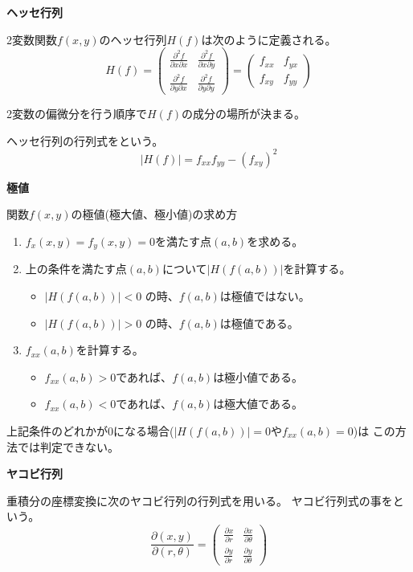 \documentclass[12pt,b5paper]{ltjsarticle}
\begin{document}
\textbf{ヘッセ行列}

2変数関数$f(x,y)$のヘッセ行列$H(f)$は次のように定義される。
\begin{equation}
 H(f)=
  \begin{pmatrix}
   \frac{\partial^2 f}{\partial x\partial x} & \frac{\partial^2 f}{\partial x\partial y}\\
   \frac{\partial^2 f}{\partial y\partial x} & \frac{\partial^2 f}{\partial y\partial y}
  \end{pmatrix}
  =
  \begin{pmatrix}
   f_{xx} & f_{yx}\\
   f_{xy} & f_{yy}
  \end{pmatrix}
\end{equation}

2変数の偏微分を行う順序で$H(f)$の成分の場所が決まる。

ヘッセ行列の行列式をという。
\begin{equation}
 \lvert H(f) \rvert = f_{xx}f_{yy}-(f_{xy})^2
\end{equation}


\textbf{極値}

関数$f(x,y)$の極値(極大値、極小値)の求め方

\begin{enumerate}
 \item $f_x(x,y)=f_y(x,y)=0$を満たす点$(a,b)$を求める。
 \item 上の条件を満たす点$(a,b)$について$\lvert H(f(a,b)) \rvert$を計算する。
       \begin{itemize}
        \item $\lvert H(f(a,b)) \rvert <0$ の時、$f(a,b)$は極値ではない。
        \item $\lvert H(f(a,b)) \rvert >0$ の時、$f(a,b)$は極値である。
       \end{itemize}
 \item $f_{xx}(a,b)$を計算する。
       \begin{itemize}
        \item $f_{xx}(a,b) >0$であれば、$f(a,b)$は極小値である。
        \item $f_{xx}(a,b) <0$であれば、$f(a,b)$は極大値である。
       \end{itemize}
\end{enumerate}
上記条件のどれかが0になる場合($\lvert H(f(a,b)) \rvert =0$や$f_{xx}(a,b) =0$)は
この方法では判定できない。


\textbf{ヤコビ行列}

重積分の座標変換に次のヤコビ行列の行列式を用いる。
ヤコビ行列式の事をという。
\begin{equation}
 \frac{\partial (x,y)}{\partial (r,\theta)}
  =
  \begin{pmatrix}
   \frac{\partial x}{\partial r} & \frac{\partial x}{\partial \theta}\\
   \frac{\partial y}{\partial r} & \frac{\partial y}{\partial \theta}
  \end{pmatrix}
\end{equation}
\end{document}
